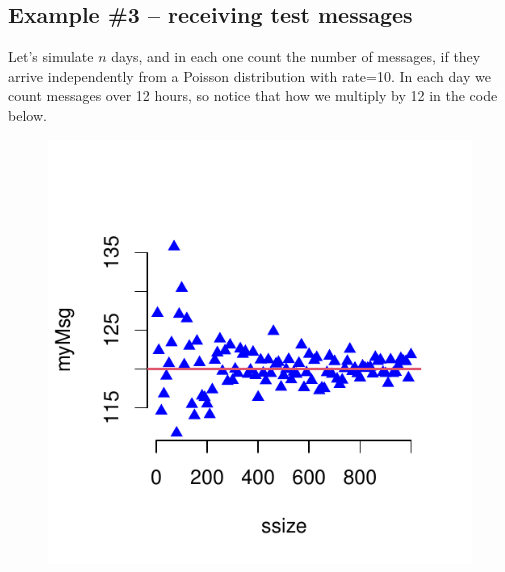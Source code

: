 \subsection{Example \#3 -- receiving test messages}
Let's simulate $n$ days, and in each one count the number of messages, if they arrive independently from a Poisson distribution with rate=10. In each day we count messages over 12 hours, so notice that how we multiply by 12 in the code below.

\begin{knitrout}
\color{fgcolor}\begin{kframe}
\begin{alltt}
 \hlkwb{<-} \hlstd{(}\hlstd{,}\hlstd{(}\hlstd{,}\hlstd{,}\hlstd{=}\hlstd{))}
 \hlkwb{<-} \hlstd{(}\hlstd{,}
\hlstd{((}\hlstd{))}
   \hlopt{:}
     \hlkwb{<-} \hlstd{(}\hlopt{*} \hlstd{))}
\hlstd{\}}
\hlstd{=}\hlstd{,}\hlstd{=}\hlstd{,} \hlstd{=}\hlstd{)}
\hlstd{(}\hlstd{);} \hlstd{(}\hlstd{)}
\hlstd{(}\hlstd{=}\hlopt{*}\hlstd{,} \hlstd{=}\hlstd{,}\hlstd{=}\hlstd{)}
\end{alltt}
\end{kframe}\begin{figure}

{\centering \includegraphics[width=\maxwidth]{figure/intro-lln2-0-1} 

}
\end{figure}
\end{knitrout}
